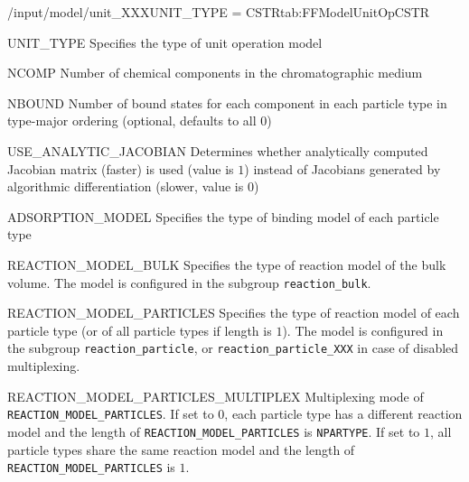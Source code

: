 \begin{condsubgroup}{/input/model/unit\_XXX}{UNIT\_TYPE = CSTR}{tab:FFModelUnitOpCSTR}
  \begin{dataset}[type=string,range={\texttt{CSTR}},length=1]{UNIT\_TYPE}
    Specifies the type of unit operation model
  \end{dataset}
  \begin{dataset}[type=int,range={$\geq 1$},length=1]{NCOMP}
    Number of chemical components in the chromatographic medium
  \end{dataset}
  \begin{dataset}[type=int,range={$\geq 0$},length={$\texttt{NPARTYPE} \cdot \texttt{NCOMP}$}]{NBOUND}
    Number of bound states for each component in each particle type in type-major ordering (optional, defaults to all $0$)
  \end{dataset}
  \begin{dataset}[type=int,range={$\{0, 1\}$},length=1]{USE\_ANALYTIC\_JACOBIAN}
    Determines whether analytically computed Jacobian matrix (faster) is used (value is $1$) instead of Jacobians generated by algorithmic differentiation (slower, value is $0$)
  \end{dataset}
  \begin{dataset}[type=string,range={See Section~\ref{sec:FFAdsorption}},length={\texttt{NPARTYPE}}]{ADSORPTION\_MODEL}
    Specifies the type of binding model of each particle type
  \end{dataset}
  \begin{dataset}[type=string,range={See Section~\ref{sec:FFReaction}},length=1]{REACTION\_MODEL\_BULK}
    Specifies the type of reaction model of the bulk volume.
    The model is configured in the subgroup \texttt{reaction\_bulk}.
  \end{dataset}
  \begin{dataset}[type=string,range={See Section~\ref{sec:FFReaction}},length={$1$ / \texttt{NPARTYPE}}]{REACTION\_MODEL\_PARTICLES}
    Specifies the type of reaction model of each particle type (or of all particle types if length is $1$).
    The model is configured in the subgroup \texttt{reaction\_particle}, or \texttt{reaction\_particle\_XXX} in case of disabled multiplexing.
  \end{dataset}
  \begin{dataset}[unit=--,type=int,range={$\{0, 1\}$},length={1}]{REACTION\_MODEL\_PARTICLES\_MULTIPLEX}
    Multiplexing mode of \texttt{REACTION\_MODEL\_PARTICLES}.
    If set to $0$, each particle type has a different reaction model and the length of \texttt{REACTION\_MODEL\_PARTICLES} is \texttt{NPARTYPE}.
    If set to $1$, all particle types share the same reaction model and the length of \texttt{REACTION\_MODEL\_PARTICLES} is $1$.


\end{dataset}
\end{condsubgroup}
